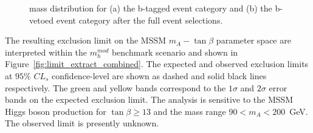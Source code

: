 \begin{figure}[tp]
     \begin{center}

    \end{center}
    \caption{\mmc mass distribution for (a) the b-tagged event category and (b) the b-vetoed event category after 
	the full event selections.}
   \label{fig:mmc_categories}
\end{figure}


The resulting exclusion limit on the MSSM $m_A - \tan\beta$ parameter space are interpreted 
within the $m_{h}^{mod}$ benchmark scenario and  shown in Figure~\ref{fig:limit_extract_combined}. 
The expected and observed exclusion limits at $95\%$ $CL_s$  confidence-level 
are shown as dashed and solid black lines respectively. The green 
and yellow bands correspond to the $1\sigma$ and $2\sigma$ error bands on the expected exclusion limit. 
The analysis is sensitive to the MSSM Higgs boson production for $\tan\beta \geq 13$ and the mass range $90<m_A<200$~GeV.
The observed limit is presently unknown. %



